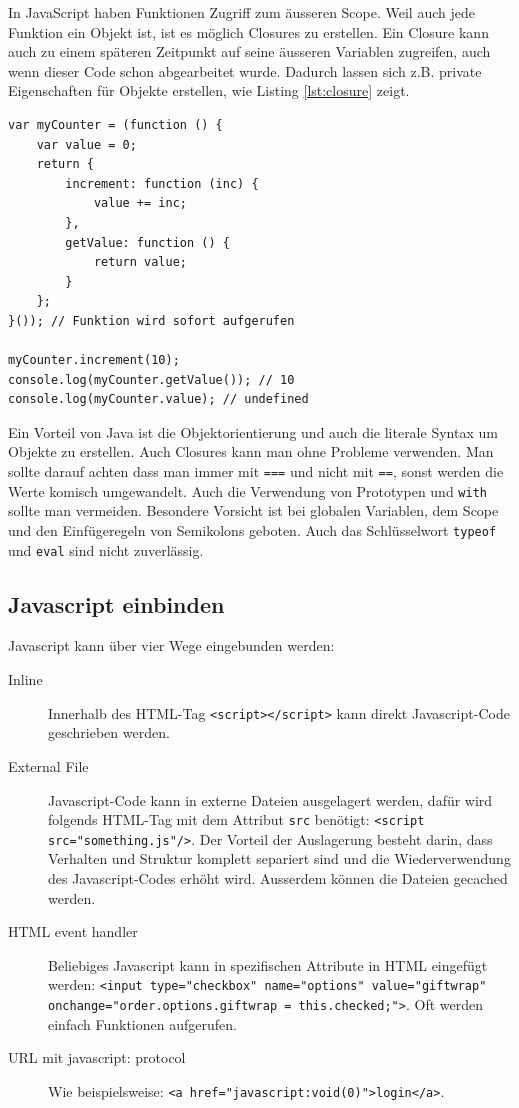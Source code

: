 In JavaScript haben Funktionen Zugriff zum äusseren Scope. Weil auch jede Funktion ein Objekt ist, ist es möglich Closures zu erstellen. Ein Closure kann auch zu einem späteren Zeitpunkt auf seine äusseren Variablen zugreifen, auch wenn dieser Code schon abgearbeitet wurde. Dadurch lassen sich z.B. private Eigenschaften für Objekte erstellen, wie Listing \ref{lst:closure} zeigt.

\begin{lstlisting}[label=lst:closure,caption=Closure]
var myCounter = (function () {
	var value = 0;
	return {
		increment: function (inc) {
			value += inc;
		},
		getValue: function () {
			return value;
		}
	};
}()); // Funktion wird sofort aufgerufen

myCounter.increment(10);
console.log(myCounter.getValue()); // 10
console.log(myCounter.value); // undefined
\end{lstlisting}

Ein Vorteil von Java ist die Objektorientierung und auch die literale Syntax um Objekte zu erstellen. Auch Closures kann man ohne Probleme verwenden. Man sollte darauf achten dass man immer mit \lstinline|===| und nicht mit \lstinline|==|, sonst werden die Werte komisch umgewandelt. Auch die Verwendung von Prototypen und \lstinline|with| sollte man vermeiden. Besondere Vorsicht ist bei globalen Variablen, dem Scope und den Einfügeregeln von Semikolons geboten. Auch das Schlüsselwort \lstinline|typeof| und \lstinline|eval| sind nicht zuverlässig.

\subsection{Javascript einbinden}
Javascript kann über vier Wege eingebunden werden:
\begin{description}
	\item[Inline] Innerhalb des HTML-Tag \lstinline|<script></script>| kann direkt Javascript-Code geschrieben werden.
	\item[External File] Javascript-Code kann in externe Dateien ausgelagert werden, dafür wird folgends HTML-Tag mit dem Attribut \lstinline|src| benötigt: \lstinline|<script src="something.js"/>|. Der Vorteil der Auslagerung besteht darin, dass Verhalten und Struktur komplett separiert sind und die Wiederverwendung des Javascript-Codes erhöht wird. Ausserdem können die Dateien gecached werden.
	\item[HTML event handler] Beliebiges Javascript kann in spezifischen Attribute in HTML eingefügt werden: \lstinline|<input type="checkbox" name="options" value="giftwrap" onchange="order.options.giftwrap = this.checked;">|. Oft werden einfach Funktionen aufgerufen.
	\item[URL mit javascript: protocol] Wie beispielsweise: \lstinline|<a href="javascript:void(0)">login</a>|.
\end{description}

